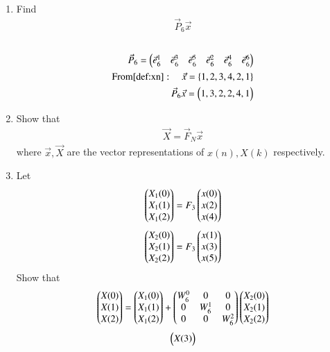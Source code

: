 \documentclass[journal,12pt,twocolumn]{IEEEtran}
\renewcommand\thesection{\arabic{section}}
\begin{document}
\begin{enumerate}[label=\arabic*.,ref=\thesection.\theenumi]
	\item Find 
	\begin{align}
		\vec{P}_6 \vec{x}
	\end{align}
	\solution\\
	\begin{align}
		\vec{P}_{6} = \begin{pmatrix}\vec{e}_6^{1} &\vec{e}_6^{3} &\vec{e}_6^{5} &\vec{e}_6^{2}
	&\vec{e}_6^{4} &\vec{e}_6^{6}\end{pmatrix}\\
		\text{From}\eqref{def:xn}: \quad \vec{x} = \left\{1,2,3,4,2,1\right\}\\
		\vec{P}_6 \vec{x} = \begin{pmatrix}1,3,2,2,4,1\end{pmatrix}
	\end{align}
	\item Show that 
	\begin{align}
		\vec{X} = \vec{F}_N \vec{x}
		\label{eq:dft-mat-def}
	\end{align}
	where $\vec{x}, \vec{X}$ are the vector representations of $x(n), X(k)$ respectively.
	\item 
	Let 
	\begin{equation}
		\begin{pmatrix}
			X_{1}(0) \\ 
			X_{1}(1) \\ 
			X_{1}(2) 
		\end{pmatrix}
		= F_{3}
		\begin{pmatrix}
			x(0) \\ 
			x(2) \\ 
			x(4) 
		\end{pmatrix}
	\end{equation}
	\begin{equation}
		\begin{pmatrix}
			X_{2}(0) \\ 
			X_{2}(1) \\ 
			X_{2}(2) 
		\end{pmatrix}
		= F_{3}
		\begin{pmatrix}
			x(1) \\ 
			x(3) \\ 
			x(5) 
		\end{pmatrix}
	\end{equation}
	Show that 
	\begin{equation}
		\begin{pmatrix}
			X(0) \\ 
			X(1) \\ 
			X(2)  
		\end{pmatrix}
		=
		\begin{pmatrix}
			X_{1}(0) \\ 
			X_{1}(1)\\ 
			X_{1}(2)
		\end{pmatrix}
		+
		\begin{pmatrix}
			W^{0}_{6} & 0 & 0\\
			0 & W^{1}_{6} & 0\\
			0 & 0 & W^{2}_{6}\\
		\end{pmatrix}
		\begin{pmatrix}
			X_{2}(0) \\ 
			X_{2}(1) \\ 
			X_{2}(2)
		\end{pmatrix}
	\end{equation}
	\begin{equation}
		\begin{pmatrix}
			X(3) \\ 
\end{pmatrix}
\end{equation}
\end{enumerate}
\end{document}
